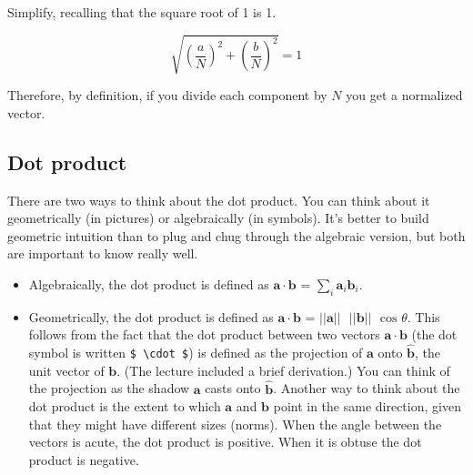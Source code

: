 \documentclass[]{article}
\theoremstyle{definition}
\begin{document}
Simplify, recalling that the square root of 1 is 1.

\begin{equation}
\sqrt{(\frac{a}{N})^2 + (\frac{b}{N})^2} = 1
\end{equation}

Therefore, by definition, if you divide each component by $N$ you get a normalized vector.

\subsection{Dot product}

There are two ways to think about the dot product. You can think about it geometrically (in pictures) or algebraically (in symbols). It's better to build geometric intuition than to plug and chug through the algebraic version, but both are important to know really well.

\begin{itemize}
\item Algebraically, the dot product is defined as $\bm{a} \cdot \bm{b}$  = $\sum_i \bm{a}_i \bm{b}_i$.
\item Geometrically, the dot product is defined as $\bm{a} \cdot \bm{b}$  = $ \vert\vert  \bm{a}  \vert\vert \text{ }   \vert\vert  \bm{b}  \vert\vert \text{ }  \text{cos }  \theta $. This follows from the fact that the dot product between two vectors $\bm{a} \cdot \bm{b}$ (the dot symbol is written \verb|$ \cdot $|) is defined as the projection of $\bm{a}$ onto $\hat{\bm{b}}$, the unit vector of $\bm{b}$. (The lecture included a brief derivation.) You can think of the projection as the shadow $\bm{a}$ casts onto $\hat{\bm{b}}$. Another way to think about the dot product is the extent to which $\bm{a}$ and $\bm{b}$ point in the same direction, given that they might have different sizes (norms).
When the angle between the vectors is acute, the dot product is positive. When it is obtuse the dot product is negative.
\end{itemize}
\end{document}
